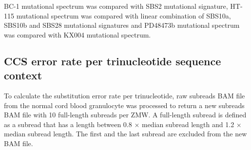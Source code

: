 BC-1 mutational spectrum was compared with SBS2 mutational signature, HT-115 mutational spectrum was compared with linear combination of SBS10a, SBS10b and SBS28 mutational signatures and PD48473b mutational spectrum was compared with KX004 mutational spectrum.
%
%
%

\subsection{CCS error rate per trinucleotide sequence context}

To calculate the substitution error rate per trinucleotide, raw subreads BAM file from the normal cord blood granulocyte was processed to return a new subreads BAM file with 10 full-length subreads per ZMW. A full-length subread is defined as a subread that has a length between 0.8 $\times$ median subread length and 1.2 $\times$ median subread length. The first and the last subread are excluded from the new BAM file. 

